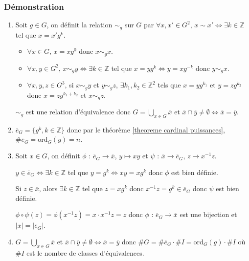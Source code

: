 \documentclass[a4paper,10pt]{book} %
\newcommand{\Z}{\mathbb{Z}}
\newcommand{\abs}[1]{\left|#1\right|}
\newcommand{\ord}{\mathrm{ord}}
\begin{document}
\subsubsection{Démonstration}
\begin{enumerate}
\item Soit $g\in G$, on définit la relation $\sim_g$ sur $G$ par $\forall x,x'\in G^2$, $x\sim x' \Leftrightarrow \exists k\in \Z$ tel que $x=x'g^k$.

\begin{itemize}
\item $\forall x\in G$, $x=xg^0 $ donc $x\sim_gx$.
\item $\forall x,y\in G^2$, $x\sim_gy\Leftrightarrow \exists k\in \Z$ tel que $x=yg^k \Leftrightarrow y=xg^{-k}$ donc $y\sim_gx$.
\item $\forall x,y,z\in G^3$, si $x\sim_gy$ et $y\sim_gz$, $\exists k_1,k_2\in \Z^2$ tels que $x=yg^{k_1}$ et $y=zg^{k_2}$ donc $x=zg^{k_1+k_2}$ et $x\sim_gz$.
\end{itemize}

$\sim_g$ est une relation d'équivalence donc $G=\bigcup_{x\in G} \overline{x}$ et $\overline{x}\cap \overline{y}\neq \emptyset \Leftrightarrow \overline{x}=\overline{y}$.\smallskip

\item $\overline{e}_G=\{g^k,k\in \Z \}$ donc par le théorème \ref{theoreme cardinal puissances}, $\# \overline{e}_G=\ord_G(g)=n$.\smallskip

\item Soit $x\in G$, on définit $\phi$ : $\overline{e}_G \rightarrow \overline{x}$, $y\mapsto xy$ et $\psi$ : $\overline{x}\rightarrow \overline{e}_G$, $z \mapsto x^{-1}z$.\smallskip

$y\in \overline{e}_G \Leftrightarrow \exists k\in \Z$ tel que $y=g^k\Leftrightarrow xy=xg^k$ donc $\phi$ est bien définie.\smallskip

Si $z\in \overline{x}$, alors $\exists k\in \Z$ tel que $z=xg^k$ donc  $x^{-1}z=g^k\in \overline{e}_G$ donc $\psi$ est bien définie.\smallskip

$\phi\circ \psi(z)=\phi(x^{-1}z)=x\cdot x^{-1}z=z$ donc $\phi$ : $\overline{e}_G\rightarrow \overline{x}$ est une bijection et $\abs{\overline{x}}=\abs{\overline{e}_G}$.\smallskip

\item $G=\bigcup_{x\in G} \overline{x}$ et $\overline{x}\cap \overline{y}\neq \emptyset \Leftrightarrow \overline{x}=\overline{y}$ donc $\# G =\#\overline{e}_G \cdot \# I=\ord_G(g)\cdot \# I$ où $\# I$ est le nombre de classes d'équivalences.
\end{enumerate}
\end{document}
